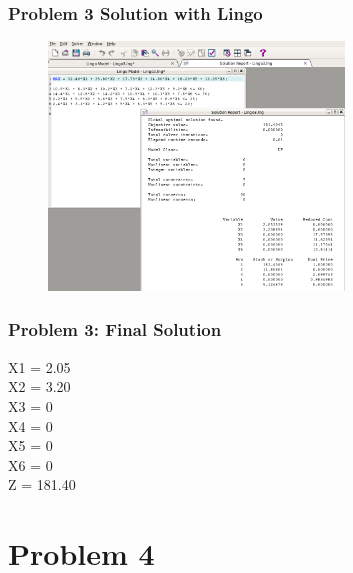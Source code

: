 \documentclass[10pt,svgnames,fragile]{beamer}
\begin{document}
\begin{frame}[label={sec:orge9abdcb}]{}
\frametitle{Problem 3 Solution with Lingo }
\begin{figure}
\includegraphics[width=0.7\textwidth]{images/3.png}
\end{figure}
\end{frame}

\begin{frame}[label={sec:org9c62e72}]{}
\frametitle{Problem 3: Final Solution}

X1 = 2.05\\
X2 = 3.20\\
X3 = 0\\
X4 = 0\\
X5 = 0\\
X6 = 0\\
Z = 181.40 
\end{frame}


\section{Problem 4}
\label{sec:org92dd686}
\end{document}
